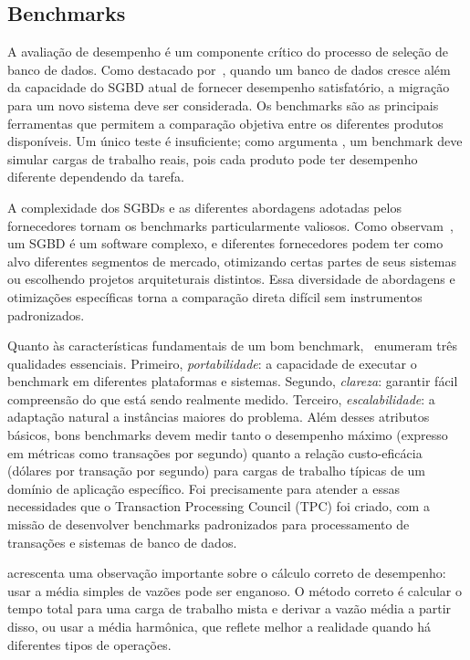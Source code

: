 \subsection{Benchmarks}

A avaliação de desempenho é um componente crítico do processo de seleção de banco de dados.
Como destacado por~\cite{Ramakrishnan2003}, quando um banco de dados cresce além da capacidade
do SGBD atual de fornecer desempenho satisfatório, a migração para um novo sistema deve ser
considerada. Os benchmarks são as principais ferramentas que permitem a comparação objetiva
entre os diferentes produtos disponíveis. Um único teste é insuficiente; como argumenta
\cite{Silberschatz2020}, um benchmark deve simular cargas de trabalho reais, pois cada produto
pode ter desempenho diferente dependendo da tarefa.

A complexidade dos SGBDs e as diferentes abordagens adotadas pelos fornecedores tornam os
benchmarks particularmente valiosos. Como observam~\cite{Ramakrishnan2003}, um SGBD é um
software complexo, e diferentes fornecedores podem ter como alvo diferentes segmentos de
mercado, otimizando certas partes de seus sistemas ou escolhendo projetos arquiteturais
distintos. Essa diversidade de abordagens e otimizações específicas torna a comparação direta
difícil sem instrumentos padronizados.

Quanto às características fundamentais de um bom benchmark,~\cite{Ramakrishnan2003} enumeram
três qualidades essenciais. Primeiro, \textit{portabilidade}: a capacidade de executar o
benchmark em diferentes plataformas e sistemas. Segundo, \textit{clareza}: garantir fácil
compreensão do que está sendo realmente medido. Terceiro, \textit{escalabilidade}: a adaptação
natural a instâncias maiores do problema. Além desses atributos básicos, bons benchmarks devem
medir tanto o desempenho máximo (expresso em métricas como transações por segundo) quanto a
relação custo-eficácia (dólares por transação por segundo) para cargas de trabalho típicas de
um domínio de aplicação específico. Foi precisamente para atender a essas necessidades que o
Transaction Processing Council (TPC) foi criado, com a missão de desenvolver benchmarks
padronizados para processamento de transações e sistemas de banco de dados.

\cite{Silberschatz2020} acrescenta uma observação importante sobre o cálculo correto de
desempenho: usar a média simples de vazões pode ser enganoso. O método correto é calcular o
tempo total para uma carga de trabalho mista e derivar a vazão média a partir disso, ou usar a
média harmônica, que reflete melhor a realidade quando há diferentes tipos de operações.

